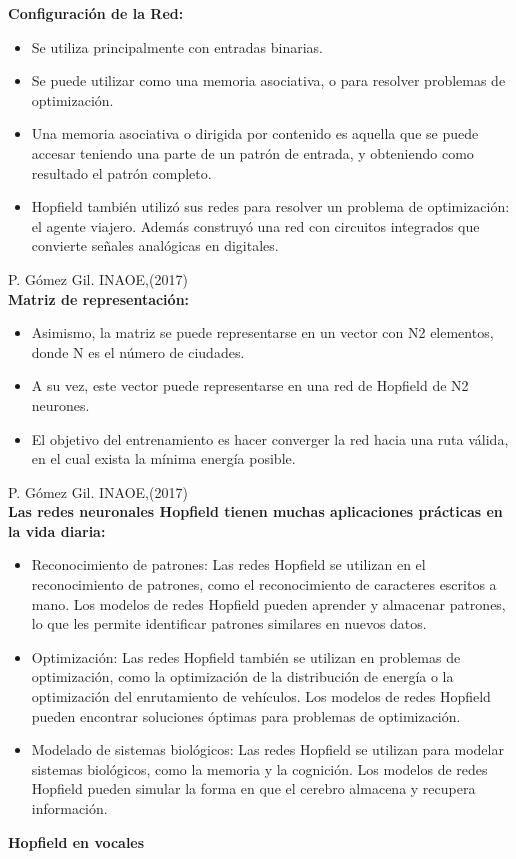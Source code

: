 \documentclass{article}
\begin{document}
\textbf{Configuración de la Red:}
\begin{itemize}
    \item Se utiliza principalmente con entradas binarias.
    \item Se puede utilizar como una memoria asociativa, o para
resolver problemas de optimización.
    \item Una memoria asociativa o dirigida por contenido es
aquella que se puede accesar teniendo una parte de un
patrón de entrada, y obteniendo como resultado el
patrón completo.
    \item Hopfield también utilizó sus redes para resolver un
problema de optimización: el agente viajero. Además
construyó una red con circuitos integrados que convierte
señales analógicas en digitales. 
\end{itemize}
\textsf{P. Gómez Gil. INAOE,(2017)}
\\
\newpage
\textbf{Matriz de representación:}
\begin{itemize}
    \item Asimismo, la matriz se puede representarse
en un vector con N2 elementos, donde N es
el número de ciudades.
    \item A su vez, este vector puede representarse en
una red de Hopfield de N2 neurones.
    \item El objetivo del entrenamiento es hacer
converger la red hacia una ruta válida, en el
cual exista la mínima energía posible.  
\end{itemize}
\textsf{P. Gómez Gil. INAOE,(2017)}
\\



\textbf{Las redes neuronales Hopfield tienen muchas aplicaciones
prácticas en la vida diaria:}
\begin{itemize}
    \item Reconocimiento de patrones: Las redes Hopfield se utilizan en el reconocimiento de patrones, como el reconocimiento de caracteres escritos a mano. Los modelos de redes Hopfield pueden aprender y almacenar patrones, lo que les permite identificar patrones similares en nuevos datos.
    \item Optimización: Las redes Hopfield también se utilizan en problemas de optimización, como la optimización de la distribución de energía o la optimización del enrutamiento de vehículos. Los modelos de redes Hopfield pueden encontrar soluciones óptimas para problemas de optimización.
    \item Modelado de sistemas biológicos: Las redes Hopfield se utilizan para modelar sistemas biológicos, como la memoria y la cognición. Los modelos de redes Hopfield pueden simular la forma en que el cerebro almacena y recupera información.
\end{itemize}
\textbf{Hopfield en vocales}
\\
\end{document}

